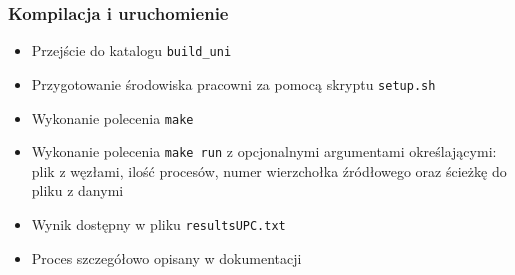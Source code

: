 \documentclass[10pt]{beamer}
\begin{document}
\begin{frame}
\frametitle{Kompilacja i uruchomienie}
\begin{itemize}
\item Przejście do katalogu \lstinline{build_uni}
\item Przygotowanie środowiska pracowni za pomocą skryptu \lstinline{setup.sh}
\item Wykonanie polecenia \lstinline{make}
\item Wykonanie polecenia \lstinline{make run} z opcjonalnymi argumentami określającymi: plik z węzłami, ilość procesów, numer wierzchołka źródłowego oraz ścieżkę do pliku z danymi
\item Wynik dostępny w pliku \lstinline{resultsUPC.txt}
\item Proces szczegółowo opisany w dokumentacji
\end{itemize}

\end{frame}
\end{document}

